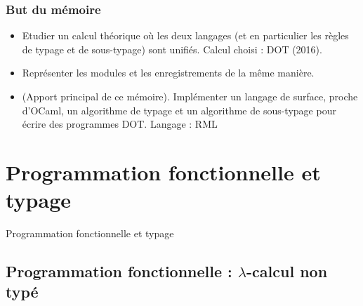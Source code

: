\documentclass{beamer}
\begin{document}
\begin{frame}
  \frametitle{But du mémoire}
  \begin{itemize}
  \item Etudier un calcul théorique où les deux langages (et en particulier les
    règles de typage et de sous-typage) sont unifiés. Calcul choisi : DOT (2016).
  \item Représenter les modules et les enregistrements de la même manière.
  \item (Apport principal de ce mémoire). Implémenter un langage de surface, proche d'OCaml, un algorithme de
    typage et un algorithme de sous-typage pour écrire des programmes DOT.
    Langage : RML
  \end{itemize}
\end{frame}

\section{Programmation fonctionnelle et typage}

\begin{frame}
	\begin{center}
		\Huge{Programmation fonctionnelle et typage}
	\end{center}
\end{frame}

\subsection*{Programmation fonctionnelle : $\lambda$-calcul non typé}
\end{document}
